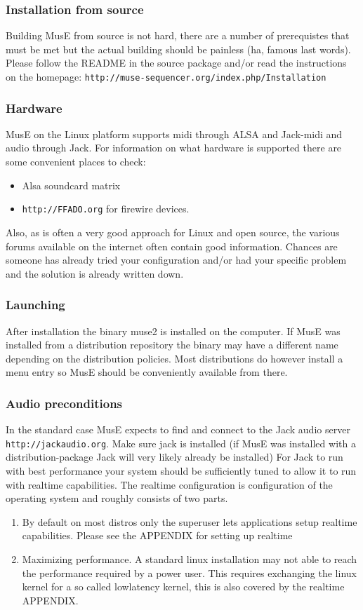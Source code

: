 \documentclass[a4paper]{report}
\newcommand{\url}[1]{\texttt{#1}}
\begin{document}
\subsubsection {Installation from source}
Building MusE from source is not hard, there are a number of prerequistes
that must be met but the actual building should be painless (ha, famous
last words).\\
Please follow the README in the source package and/or read the instructions
on the homepage: \url{http://muse-sequencer.org/index.php/Installation}

\subsubsection {Hardware}
MusE on the Linux platform supports midi through ALSA and Jack-midi and audio
through Jack. For information on what hardware is supported there are some
convenient places to check:
\begin {itemize}
\item Alsa soundcard matrix
\item \url{http://FFADO.org} for firewire devices.
\end {itemize}
Also, as is often a very good approach for Linux and open source, the
various forums available on the internet often contain good information.
Chances are someone has already tried your configuration and/or had your
specific problem and the solution is already written down.
\subsubsection {Launching}
After installation the binary muse2 is installed on the computer. If MusE
was installed from a distribution repository the binary may have a
different name depending on the distribution policies. Most distributions
do however install a menu entry so MusE should be conveniently available
from there.
\subsubsection {Audio preconditions}
In the standard case MusE expects to find and connect to the Jack audio
server \url{http://jackaudio.org}. Make sure jack is installed (if MusE was
installed with a distribution-package Jack will very likely already be
installed) For Jack to run with best performance your system should be
sufficiently tuned to allow it to run with realtime capabilities. The
realtime configuration is configuration of the operating system and roughly
consists of two parts.
\begin {enumerate}
\item By default on most distros only the superuser lets applications setup
realtime capabilities. Please see the APPENDIX for setting up realtime
\item Maximizing performance. A standard linux installation may not able
to reach the performance required by a power user. This requires exchanging
the linux kernel for a so called lowlatency kernel, this is also covered by
the realtime APPENDIX.
\end {enumerate}
\end{document}
